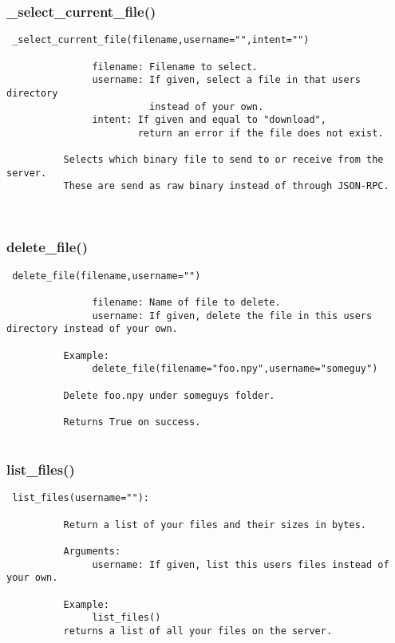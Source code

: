 \subsubsection{\_select\_current\_file()}


\begin{verbatim}
 _select_current_file(filename,username="",intent="")

               filename: Filename to select.
               username: If given, select a file in that users directory
                         instead of your own.
               intent: If given and equal to "download",
                       return an error if the file does not exist.

          Selects which binary file to send to or receive from the server.
          These are send as raw binary instead of through JSON-RPC.

          
\end{verbatim}
\subsubsection{delete\_file()}


\begin{verbatim}
 delete_file(filename,username="")

               filename: Name of file to delete.
               username: If given, delete the file in this users directory instead of your own.
          
          Example:
               delete_file(filename="foo.npy",username="someguy")

          Delete foo.npy under someguys folder.

          Returns True on success.
          
\end{verbatim}
\subsubsection{list\_files()}


\begin{verbatim}
 list_files(username=""):

          Return a list of your files and their sizes in bytes.

          Arguments:
               username: If given, list this users files instead of your own.

          Example:
               list_files()
          returns a list of all your files on the server.

          
\end{verbatim}
